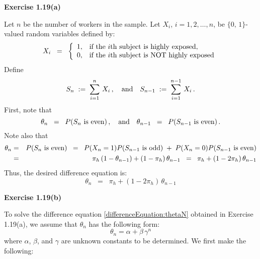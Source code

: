 
\noindent
\textbf{Exercise 1.19(a)}

\newcommand{\pih}{\pi_{h}}

\vskip 0.5cm
\noindent
Let $n$ be the number of workers in the sample.
Let $X_{i}$, $i = 1,2,\ldots,n$, be $\{0,\,1\}$-valued random variables defined by:
\begin{equation*}
X_{i} \;\; =\;\;
\left\{\begin{array}{cl}
1, & \textnormal{if the $i$th subject is highly exposed},    \\
0, & \textnormal{if the $i$th subject is NOT highly exposed} \\
\end{array}\right.
\end{equation*}
Define
\begin{equation*}
S_{n} \; := \; \sum_{i=1}^{n}\,X_{i}\,,
\quad\textnormal{and}\quad
S_{n-1} \; := \; \sum_{i=1}^{n-1}\,X_{i}\,.
\end{equation*}
First, note that
\begin{equation*}
\theta_{n} \;\; = \;\; P(S_{n}\textnormal{ is even})\,,
\quad\textnormal{and}\quad
\theta_{n-1} \;\; = \;\; P(S_{n-1}\textnormal{ is even})\,.
\end{equation*}
Note also that
\begin{eqnarray*}
\theta_{n}
& = &     P(S_{n}\textnormal{ is even})
\;\;=\;\; P(X_{n} = 1) P(S_{n-1}\textnormal{ is odd})\;+\;P(X_{n} = 0)P(S_{n-1}\textnormal{ is even}) \\
& = &     \pih\,(1 - \theta_{n-1}) + (1 - \pih)\,\theta_{n-1}
\;\;=\;\; \pih + (1 - 2\pih)\,\theta_{n-1}
\end{eqnarray*}
Thus, the desired difference equation is:
\begin{equation}
\label{differenceEquation:thetaN}
\theta_{n} \;\;=\;\; \pih + (1 - 2\pih)\,\theta_{n-1}
\end{equation}

\vskip 1.0cm
\noindent
\textbf{Exercise 1.19(b)}

\vskip 0.5cm
\noindent
To solve the difference equation \eqref{differenceEquation:thetaN} obtained in Exercise 1.19(a),
we assume that $\theta_{n}$ has the following form:
\begin{equation}
\label{specialForm:thetaN}
\theta_{n} = \alpha + \beta\,\gamma^{n}
\end{equation}
where $\alpha$, $\beta$, and $\gamma$ are unknown constants to be determined.
We first make the following:

